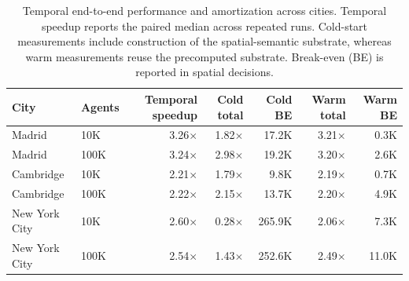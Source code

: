 \begin{table}[t]
\centering
\caption{Temporal end-to-end performance and amortization across cities. Temporal speedup reports the paired median across repeated runs. Cold-start measurements include construction of the spatial-semantic substrate, whereas warm measurements reuse the precomputed substrate. Break-even (BE) is reported in spatial decisions.}
\label{tab:end_to_end}
\begin{tabular}{llrrrrr}
\toprule
City & Agents & Temporal speedup & Cold total & Cold BE & Warm total & Warm BE \\
\midrule
Madrid & 10K & 3.26$\times$ & 1.82$\times$ & 17.2K & 3.21$\times$ & 0.3K \\
Madrid & 100K & 3.24$\times$ & 2.98$\times$ & 19.2K & 3.20$\times$ & 2.6K \\
Cambridge & 10K & 2.21$\times$ & 1.79$\times$ & 9.8K & 2.19$\times$ & 0.7K \\
Cambridge & 100K & 2.22$\times$ & 2.15$\times$ & 13.7K & 2.20$\times$ & 4.9K \\
New York City & 10K & 2.60$\times$ & 0.28$\times$ & 265.9K & 2.06$\times$ & 7.3K \\
New York City & 100K & 2.54$\times$ & 1.43$\times$ & 252.6K & 2.49$\times$ & 11.0K \\
\bottomrule
\end{tabular}
\end{table}